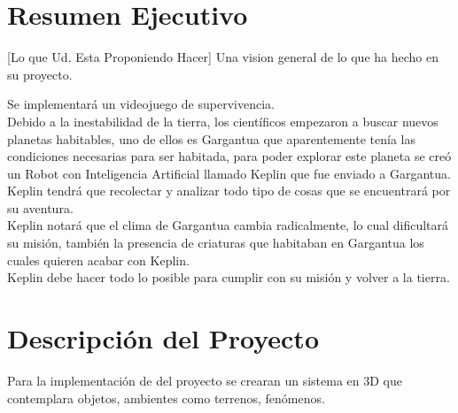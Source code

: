 \documentclass[a4paper]{article}
\begin{document}
\pagebreak
\section{Resumen Ejecutivo}
[Lo que Ud. Esta Proponiendo Hacer] Una vision general de lo que ha
hecho en su proyecto.

Se implementará un videojuego de supervivencia.\\
Debido a la inestabilidad de la tierra, los científicos empezaron a buscar nuevos planetas habitables, uno de ellos es Gargantua que aparentemente tenía las condiciones necesarias para ser habitada, para poder explorar este planeta se creó un Robot con Inteligencia Artificial llamado Keplin que fue enviado a Gargantua. Keplin tendrá que recolectar y analizar todo tipo de cosas que se encuentrará por su aventura.\\
Keplin notará que el clima de Gargantua cambia radicalmente, lo cual dificultará su misión, también la presencia de criaturas que habitaban en Gargantua los cuales quieren acabar con Keplin.\\
Keplin debe hacer todo lo posible para cumplir con su misión y volver a la tierra.

\section{Descripción del Proyecto}

Para la implementación de del proyecto se crearan un sistema en 3D que 
contemplara objetos, ambientes como terrenos, fenómenos.\\
\end{document}

